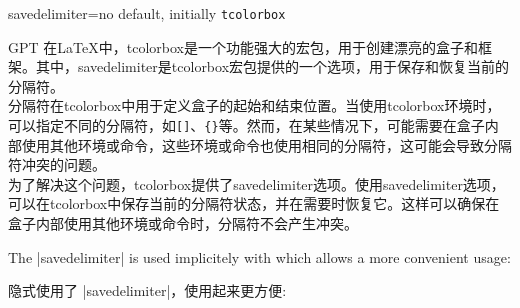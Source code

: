 \begin{docTcbKey}{savedelimiter}{=}{no default, initially \texttt{tcolorbox}}
\begin{引述之言}{GPT}
在LaTeX中，tcolorbox是一个功能强大的宏包，用于创建漂亮的盒子和框架。其中，savedelimiter是tcolorbox宏包提供的一个选项，用于保存和恢复当前的分隔符。
\\[0.5em]
分隔符在tcolorbox中用于定义盒子的起始和结束位置。当使用tcolorbox环境时，可以指定不同的分隔符，如\verb|[]|、\verb|{}|等。然而，在某些情况下，可能需要在盒子内部使用其他环境或命令，这些环境或命令也使用相同的分隔符，这可能会导致分隔符冲突的问题。
\\[0.5em]
为了解决这个问题，tcolorbox提供了savedelimiter选项。使用savedelimiter选项，可以在tcolorbox中保存当前的分隔符状态，并在需要时恢复它。这样可以确保在盒子内部使用其他环境或命令时，分隔符不会产生冲突。
\end{引述之言}



The |savedelimiter| is used implicitely with  which
allows a more convenient usage:

 隐式使用了 |savedelimiter|，使用起来更方便:
\end{docTcbKey}